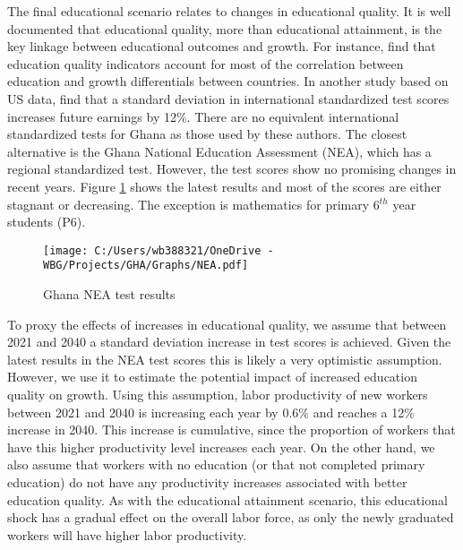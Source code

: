 \documentclass[11pt,english]{article}
\begin{document}
The final educational scenario relates to changes in educational quality. It is well documented that educational quality, more than educational attainment, is the key linkage between educational outcomes and growth. For instance, \citet{Hanushek_Woessmann_2007} find that education quality indicators account for most of the correlation between education and growth differentials between countries. In another study based on US data, \citet{Hanushek_Woessmann_2008} find that a standard deviation in international standardized test scores increases future earnings by 12\%. There are no equivalent international standardized tests for Ghana as those used by these authors. The closest alternative is the Ghana National Education Assessment (NEA), which has a regional standardized test. However, the test scores show no promising changes in recent years. Figure \ref{fig_NEA} shows the latest results and most of the scores are either stagnant or decreasing. The exception is mathematics for primary 6$^{th}$ year students (P6).

\begin{figure}[ht!]\caption{Ghana NEA test results} \label{fig_NEA}
	\centering
	\texttt{[image: C:/Users/wb388321/OneDrive - WBG/Projects/GHA/Graphs/NEA.pdf]}
\end{figure}

To proxy the effects of increases in educational quality, we assume that between 2021 and 2040 a standard deviation increase in test scores is achieved. Given the latest results in the NEA test scores this is likely a very optimistic assumption. However, we use it to estimate the potential impact of increased education quality on growth. Using this assumption, labor productivity of new workers between 2021 and 2040 is increasing each year by 0.6\% and reaches a 12\% increase in 2040. This increase is cumulative, since the proportion of workers that have this higher productivity level increases each year. On the other hand, we also assume that workers with no education (or that not completed primary education) do not have any productivity increases associated with better education quality. As with the educational attainment scenario, this educational shock has a gradual effect on the overall labor force, as only the newly graduated workers will have higher labor productivity.
\end{document}
